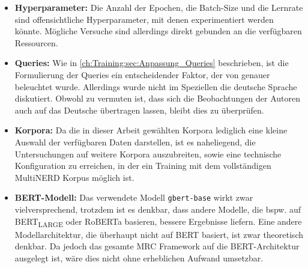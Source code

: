 \begin{itemize}
	\item \textbf{Hyperparameter:} Die Anzahl der Epochen, die Batch-Size und die Lernrate sind offensichtliche Hyperparameter, mit denen experimentiert werden könnte. Mögliche Versuche sind allerdings direkt gebunden an die verfügbaren Ressourcen.
	\item \textbf{Queries:} Wie in \autoref{ch:Training:sec:Anpassung_Queries} beschrieben, ist die Formulierung der Queries ein entscheidender Faktor, der von  genauer beleuchtet wurde. Allerdings wurde nicht im Speziellen die deutsche Sprache diskutiert. Obwohl zu vermuten ist, dass sich die Beobachtungen der Autoren auch auf das Deutsche übertragen lassen, bleibt dies zu überprüfen.
	\item \textbf{Korpora:} Da die in dieser Arbeit gewählten Korpora lediglich eine kleine Auswahl der verfügbaren Daten darstellen, ist es naheliegend, die Untersuchungen auf weitere Korpora auszubreiten, sowie eine technische Konfiguration zu erreichen, in der ein Training mit dem vollständigen MultiNERD Korpus möglich ist.
	\item \textbf{BERT-Modell:} Das verwendete Modell \verb|gbert-base| wirkt zwar vielversprechend, trotzdem ist es denkbar, dass andere Modelle, die bspw. auf BERT\textsubscript{LARGE} oder RoBERTa basieren, bessere Ergebnisse liefern. Eine andere Modellarchitektur, die überhaupt nicht auf BERT basiert, ist zwar theoretisch denkbar. Da jedoch das gesamte MRC Framework auf die BERT-Architektur ausgelegt ist, wäre dies nicht ohne erheblichen Aufwand umsetzbar.
\end{itemize}

